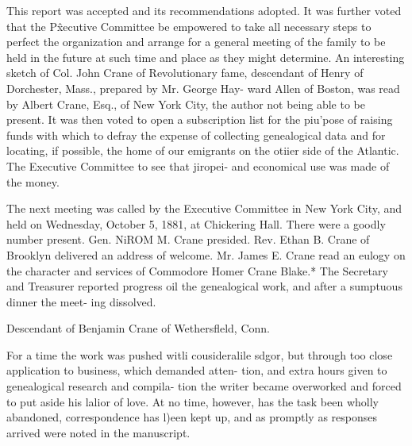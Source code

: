 \documentclass{book}
\begin{document}
This report was accepted and its recommendations adopted. 
It was further voted that the P\^xecutive Committee be empowered 
to take all necessary steps to perfect the organization and arrange 
for a general meeting of the family to be held in the future at 
such time and place as they might determine. An interesting 
sketch of Col. John Crane of Revolutionary fame, descendant 
of Henry of Dorchester, Mass., prepared by Mr. George Hay- 
ward Allen of Boston, was read by Albert Crane, Esq., of New 
York City, the author not being able to be present. It was then 
voted to open a subscription list for the piu'pose of raising funds 
with which to defray the expense of collecting genealogical data 
and for locating, if possible, the home of our emigrants on the 
otiier side of the Atlantic. The Executive Committee to see that 
jiropei- and economical use was made of the money. 

The next meeting was called by the Executive Committee in 
New York City, and held on Wednesday, October 5, 1881, at 
Chickering Hall. There were a goodly number present. Gen. 
NiROM M. Crane presided. Rev. Ethan B. Crane of Brooklyn 
delivered an address of welcome. Mr. James E. Crane read an 
eulogy on the character and services of Commodore Homer 
Crane Blake.* The Secretary and Treasurer reported progress 
oil the genealogical work, and after a sumptuous dinner the meet- 
ing dissolved. 



Descendant of Benjamin Crane of Wethersfleld, Conn. 



For a time the work was pushed witli cousideralile sdgor, but 
through too close application to business, which demanded atten- 
tion, and extra hours given to genealogical research and compila- 
tion the writer became overworked and forced to put aside his 
lalior of love. At no time, however, has the task been wholly 
abandoned, correspondence has l)een kept up, and as promptly as 
responses arrived were noted in the manuscript. 
\end{document}

